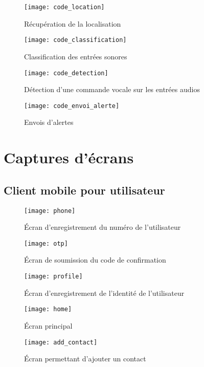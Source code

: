 \begin{figure}[H]
	\centering
	\texttt{[image: code\_location]}
	\caption{Récupération de la localisation}
\end{figure}

\begin{figure}[H]
	\centering
	\texttt{[image: code\_classification]}
	\caption{Classification des entrées sonores}
\end{figure}

\begin{figure}[H]
	\centering
	\texttt{[image: code\_detection]}
	\caption{Détection d’une commande vocale sur les entrées audios}
\end{figure}

\begin{figure}[H]
	\centering
	\texttt{[image: code\_envoi\_alerte]}
	\caption{Envois d’alertes}
\end{figure}

\section{Captures d’écrans}
\subsection{Client mobile pour utilisateur}

\begin{figure}[H]
	\centering
	\texttt{[image: phone]}
	\caption{Écran d’enregistrement du numéro de l’utilisateur}
\end{figure}

\begin{figure}[H]
	\centering
	\texttt{[image: otp]}
	\caption{Écran de soumission du code de confirmation}
\end{figure}

\begin{figure}[H]
	\centering
	\texttt{[image: profile]}
	\caption{Écran d’enregistrement de l’identité de l’utilisateur}
\end{figure}

\begin{figure}[H]
	\centering
	\texttt{[image: home]}
	\caption{Écran principal}
\end{figure}

\begin{figure}[H]
	\centering
	\texttt{[image: add\_contact]}
	\caption{Écran permettant d’ajouter un contact}
\end{figure}

